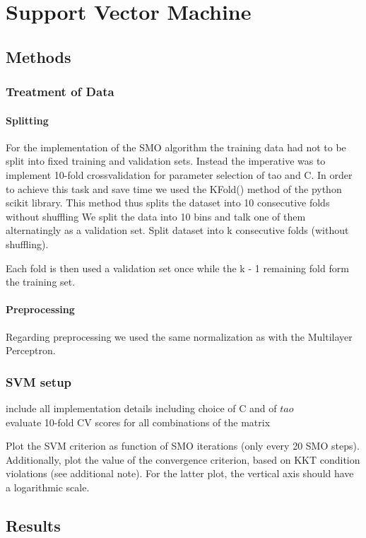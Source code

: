 \section{Support Vector Machine}

\subsection{Methods}

\subsubsection{Treatment of Data}
\paragraph{Splitting}
For the implementation of the SMO algorithm the training data had not to be split into fixed training and validation sets. Instead the imperative was to implement 10-fold crossvalidation for parameter selection of tao and C. In order to achieve this task and save time we used the KFold() method of the python scikit library. This method thus splits the dataset into 10 consecutive folds without shuffling We split the data into 10 bins and talk one of them alternatingly as a validation set.
Split dataset into k consecutive folds (without shuffling).

Each fold is then used a validation set once while the k - 1 remaining fold form the training set.

\paragraph{Preprocessing}
Regarding preprocessing we used the same normalization as with the Multilayer Perceptron.

\subsubsection{SVM setup}
include all implementation details including choice of C and of $tao$\\
evaluate 10-fold CV scores for all combinations of the matrix

Plot the SVM criterion as function of SMO iterations (only
every 20 SMO steps). Additionally, plot the value of the convergence criterion,
based on KKT condition violations (see additional note). For the latter plot,
the vertical axis should have a logarithmic scale.
\subsection{Results}